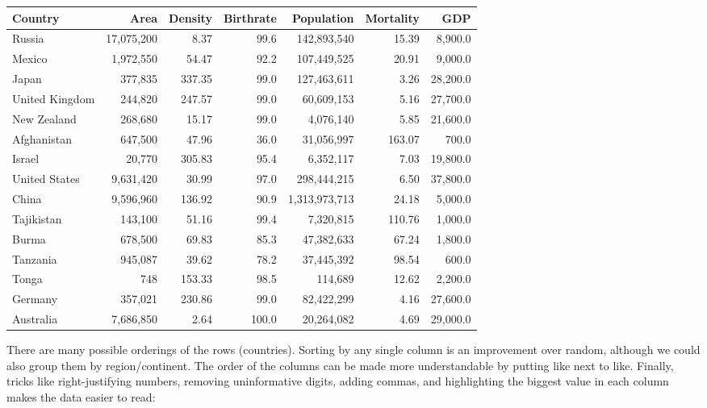 \documentclass[10pt]{article}
\begin{document}
\begin{table}[h!]
\centering
\begin{tabular}{l|rrrrrr}
Country & Area & Density & Birthrate & Population & Mortality & GDP \\
\hline
Russia & 17,075,200 & 8.37 & 99.6 & 142,893,540 & 15.39 & 8,900.0 \\
Mexico & 1,972,550 & 54.47 & 92.2 & 107,449,525 & 20.91 & 9,000.0 \\
Japan & 377,835 & 337.35 & 99.0 & 127,463,611 & 3.26 & 28,200.0 \\
United Kingdom & 244,820 & 247.57 & 99.0 & 60,609,153 & 5.16 & 27,700.0 \\
New Zealand & 268,680 & 15.17 & 99.0 & 4,076,140 & 5.85 & 21,600.0 \\
Afghanistan & 647,500 & 47.96 & 36.0 & 31,056,997 & 163.07 & 700.0 \\
Israel & 20,770 & 305.83 & 95.4 & 6,352,117 & 7.03 & 19,800.0 \\
United States & 9,631,420 & 30.99 & 97.0 & 298,444,215 & 6.50 & 37,800.0 \\
China & 9,596,960 & 136.92 & 90.9 & 1,313,973,713 & 24.18 & 5,000.0 \\
Tajikistan & 143,100 & 51.16 & 99.4 & 7,320,815 & 110.76 & 1,000.0 \\
Burma & 678,500 & 69.83 & 85.3 & 47,382,633 & 67.24 & 1,800.0 \\
Tanzania & 945,087 & 39.62 & 78.2 & 37,445,392 & 98.54 & 600.0 \\
Tonga & 748 & 153.33 & 98.5 & 114,689 & 12.62 & 2,200.0 \\
Germany & 357,021 & 230.86 & 99.0 & 82,422,299 & 4.16 & 27,600.0 \\
Australia & 7,686,850 & 2.64 & 100.0 & 20,264,082 & 4.69 & 29,000.0 \\
\hline
\end{tabular}
\end{table}

There are many possible orderings of the rows (countries). Sorting by any single column is an improvement over random, although we could also group them by region/continent. The order of the columns can be made more understandable by putting like next to like. Finally, tricks like right-justifying numbers, removing uninformative digits, adding commas, and highlighting the biggest value in each column makes the data easier to read:
\end{document}
